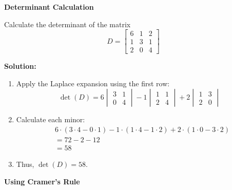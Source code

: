 \documentclass[8pt, a4paper, landscape]{extarticle}
\begin{document}
\begin{multicols*}{4}


  \textbf{Determinant Calculation}

  Calculate the determinant of the matrix
  \[
    D = \begin{bmatrix} 6 & 1 & 2 \\ 1 & 3 & 1 \\ 2 & 0 & 4 \end{bmatrix}
  \]

  \textbf{Solution:}
  \begin{enumerate}
    \item Apply the Laplace expansion using the first row:
          \[
            \det(D) = 6\begin{vmatrix} 3 & 1 \\ 0 & 4 \end{vmatrix} - 1\begin{vmatrix} 1 & 1 \\ 2 & 4 \end{vmatrix} + 2\begin{vmatrix} 1 & 3 \\ 2 & 0 \end{vmatrix}
          \]
    \item Calculate each minor:
          \begin{equation}
            \begin{aligned}
               & 6\cdot(3 \cdot 4 - 0 \cdot 1) - 1\cdot(1 \cdot 4 - 1 \cdot 2) + 2\cdot(1 \cdot 0 - 3 \cdot 2) \\
               & = 72 - 2 - 12                                                                                 \\
               & = 58
            \end{aligned}
          \end{equation}
    \item Thus, $\det(D) = 58$.
  \end{enumerate}

  \textbf{Using Cramer's Rule}


\end{multicols*}
\end{document}
